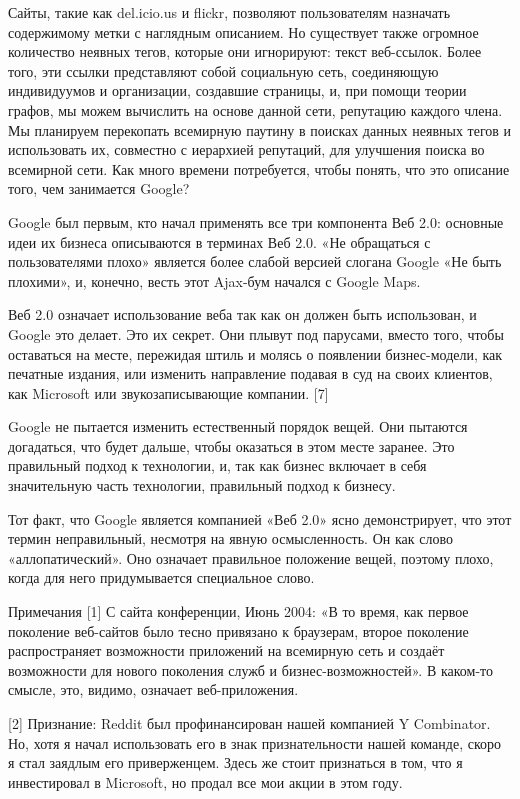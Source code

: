 \documentclass[ebook,12pt,oneside,openany]{memoir}
\begin{document}
Сайты, такие как del.icio.us и flickr, позволяют пользователям
назначать содержимому метки с наглядным описанием. Но существует также
огромное количество неявных тегов, которые они игнорируют: текст
веб-ссылок. Более того, эти ссылки представляют собой социальную сеть,
соединяющую индивидуумов и организации, создавшие страницы, и, при
помощи теории графов, мы можем вычислить на основе данной сети,
репутацию каждого члена. Мы планируем перекопать всемирную паутину в
поисках данных неявных тегов и использовать их, совместно с иерархией
репутаций, для улучшения поиска во всемирной сети. Как много времени
потребуется, чтобы понять, что это описание того, чем занимается
Google?

Google был первым, кто начал применять все три компонента Веб 2.0:
основные идеи их бизнеса описываются в терминах Веб 2.0. «Не
обращаться с пользователями плохо» является более слабой версией
слогана Google «Не быть плохими», и, конечно, весть этот Ajax-бум
начался с Google Maps.

Веб 2.0 означает использование веба так как он должен быть
использован, и Google это делает. Это их секрет. Они плывут под
парусами, вместо того, чтобы оставаться на месте, пережидая штиль и
молясь о появлении бизнес-модели, как печатные издания, или изменить
направление подавая в суд на своих клиентов, как Microsoft или
звукозаписывающие компании. [7]

Google не пытается изменить естественный порядок вещей. Они пытаются
догадаться, что будет дальше, чтобы оказаться в этом месте заранее.
Это правильный подход к технологии, и, так как бизнес включает в себя
значительную часть технологии, правильный подход к бизнесу.

Тот факт, что Google является компанией «Веб 2.0» ясно демонстрирует,
что этот термин неправильный, несмотря на явную осмысленность. Он как
слово «аллопатический». Оно означает правильное положение вещей,
поэтому плохо, когда для него придумывается специальное слово.

Примечания [1] С сайта конференции, Июнь 2004: «В то время, как первое
поколение веб-сайтов было тесно привязано к браузерам, второе
поколение распространяет возможности приложений на всемирную сеть и
создаёт возможности для нового поколения служб и бизнес-возможностей».
В каком-то смысле, это, видимо, означает веб-приложения.

[2] Признание: Reddit был профинансирован нашей компанией Y
Combinator. Но, хотя я начал использовать его в знак признательности
нашей команде, скоро я стал заядлым его приверженцем. Здесь же стоит
признаться в том, что я инвестировал в Microsoft, но продал все мои
акции в этом году.
\end{document}

